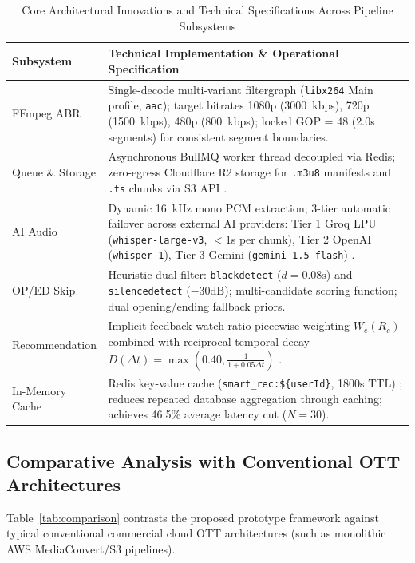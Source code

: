 \documentclass[conference]{IEEEtran}
\begin{document}
\begin{table}[!t]
\caption{Core Architectural Innovations and Technical Specifications Across Pipeline Subsystems}
\label{tab:specifications}
\centering
\small
\begin{tabularx}{\textwidth}{lX}
\toprule
\textbf{Subsystem} & \textbf{Technical Implementation \& Operational Specification} \\
\midrule
FFmpeg ABR & Single-decode multi-variant filtergraph (\texttt{libx264} Main profile, \texttt{aac}); target bitrates 1080p (3000~kbps), 720p (1500~kbps), 480p (800~kbps); locked GOP = 48 (2.0s segments) for consistent segment boundaries. \\
\addlinespace[3pt]
Queue \& Storage & Asynchronous BullMQ worker thread decoupled via Redis; zero-egress Cloudflare R2 storage for \texttt{.m3u8} manifests and \texttt{.ts} chunks via S3 API \cite{b7}. \\
\addlinespace[3pt]
AI Audio & Dynamic 16~kHz mono PCM extraction; 3-tier automatic failover across external AI providers: Tier 1 Groq LPU (\texttt{whisper-large-v3}, $<1$s per chunk), Tier 2 OpenAI (\texttt{whisper-1}), Tier 3 Gemini (\texttt{gemini-1.5-flash}) \cite{b9}. \\
\addlinespace[3pt]
OP/ED Skip & Heuristic dual-filter: \texttt{blackdetect} ($d=0.08\text{s}$) and \texttt{silencedetect} ($-30\text{dB}$); multi-candidate scoring function; dual opening/ending fallback priors. \\
\addlinespace[3pt]
Recommendation & Implicit feedback watch-ratio piecewise weighting $W_e(R_c)$ combined with reciprocal temporal decay $D(\Delta t) = \max(0.40, \frac{1}{1 + 0.05 \Delta t})$ \cite{b6}. \\
\addlinespace[3pt]
In-Memory Cache & Redis key-value cache (\texttt{smart\_rec:\$\{userId\}}, 1800s TTL) \cite{b8}; reduces repeated database aggregation through caching; achieves 46.5\% average latency cut ($N=30$). \\
\bottomrule
\end{tabularx}
\end{table}

\subsection{Comparative Analysis with Conventional OTT Architectures}
Table~\ref{tab:comparison} contrasts the proposed prototype framework against typical conventional commercial cloud OTT architectures (such as monolithic AWS MediaConvert/S3 pipelines).
\end{document}
